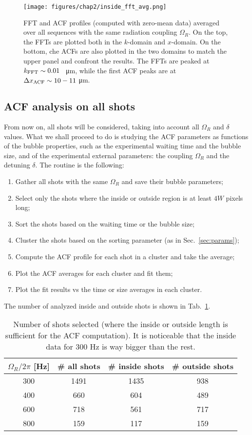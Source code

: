 \begin{figure}[t!]
    \centering
    \texttt{[image: figures/chap2/inside\_fft\_avg.png]}
    \caption{FFT and ACF profiles (computed with zero-mean data) averaged over all sequences with the same radiation coupling $\Omega_R$. On the top, the FFTs are plotted both in the $k$-domain and $x$-domain. On the bottom, che ACFs are also plotted in the two domains to match the upper panel and confront the results.
    The FFTs are peaked at $k_{\rm FFT} \sim 0.01$ \unit{\per\micro\meter}, while the first ACF peaks are at $\Delta x_{\rm ACF} \sim 10-11$ \unit{\micro\meter}.}
    \label{fig:inside_avg}
\end{figure}

\subsection{ACF analysis on all shots}
From now on, all shots will be considered, taking into account all $\Omega_R$ and $\delta$ values. What we shall proceed to do is studying the ACF parameters as functions of the bubble properties, such as the experimental waiting time and the bubble size, and of the experimental external parameters: the coupling $\Omega_R$ and the detuning $\delta$. 
The routine is the following:
\begin{enumerate}
    \item Gather all shots with the same $\Omega_R$ and save their bubble parameters;
    \item Select only the shots where the inside or outside region is at least $4W$ pixels long;
    \item Sort the shots based on the waiting time or the bubble size;
    \item Cluster the shots based on the sorting parameter (as in Sec.\ \ref{sec:params});
    \item Compute the ACF profile for each shot in a cluster and take the average;
    \item Plot the ACF averages for each cluster and fit them;
    \item Plot the fit results vs the time or size averages in each cluster.
\end{enumerate}
The number of analyzed inside and outside shots is shown in Tab.\ \ref{tab:shots}.
\begin{table}[ht!]
    \centering
    \begin{tabular}{c|c|c|c}
        $\Omega_R/2\pi$ [\unit{\hertz}] & \# all shots & \# inside shots & \# outside shots \\
        \hline
        300 & 1491 & 1435 & 938\\   
        400 & 660 & 604 & 489\\
        600 & 718 & 561 & 717\\
        800 & 159 & 117 & 159\\     
    \end{tabular}
    \caption{Number of shots selected (where the inside or outside length is sufficient for the ACF computation). It is noticeable that the inside data for 300 \unit{\hertz} is way bigger than the rest.}
    \label{tab:shots}
\end{table}
